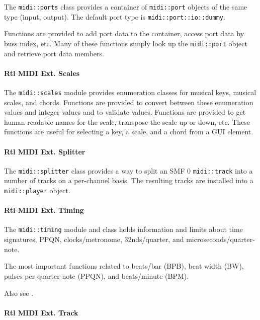    The \texttt{midi::ports} class provides a container of
   \texttt{midi::port} objects of the same type (input, output).
   The default port type is \texttt{midi::port::io::dummy}.

   Functions are provided to add port data to the container,
   access port data by buss index, etc. Many of these functions
   simply look up the \texttt{midi::port} object and retrieve
   port data members.

\paragraph{Rtl MIDI Ext. Scales}
\label{paragraph:rtl_midi_extensions_scales}

   The \texttt{midi::scales} module provides enumeration classes
   for musical keys, musical scales, and chords.
   Functions are provided to convert between these enumeration
   values and integer values and to validate values.
   Functions are provided to get human-readable names for the
   scale, transpose the scale up or down, etc.
   These functions are useful for selecting a key, a scale,
   and a chord from a GUI element.

\paragraph{Rtl MIDI Ext. Splitter}
\label{paragraph:rtl_midi_extensions_splitter}

   The \texttt{midi::splitter} class provides a way to split
   an SMF 0 \texttt{midi::track} into a number of
   tracks on a per-channel basis.
   The resulting tracks are installed into a
   \texttt{midi::player} object.

\paragraph{Rtl MIDI Ext. Timing}
\label{paragraph:rtl_midi_extensions_timing}

   The \texttt{midi::timing} module and class holds
   information and limits about time signatures, PPQN, clocks/metronome,
   32nds/quarter, and microseconds/quarter-note.

   The most important functions related to beats/bar (BPB),
   beat width (BW), pulses per quarter-note (PPQN), and
   beats/minute (BPM).

   Also see .

\paragraph{Rtl MIDI Ext. Track}
\label{paragraph:rtl_midi_extensions_track}

